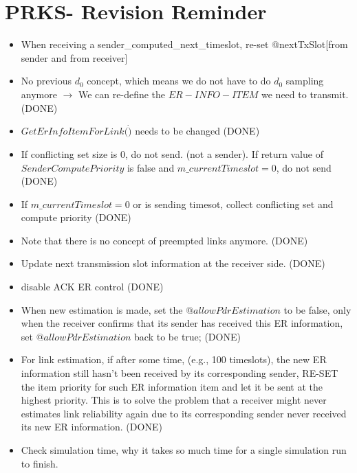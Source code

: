 \section {PRKS- Revision Reminder}
\begin{itemize}
  \item When receiving a sender\_computed\_next\_timeslot, re-set @nextTxSlot[from sender and from receiver]

  \item No previous $d_0$ concept, which means we do not have to do $d_0$ sampling anymore $\rightarrow$ We can re-define the $ER-INFO-ITEM$ we need to transmit.(DONE)
  \item $GetErInfoItemForLink (\dot)$ needs to be changed (DONE)
  \item If conflicting set size is 0, do not send. (not a sender). If return value of $SenderComputePriority$ is false and $m\_currentTimeslot = 0$, do not send (DONE)
  \item If $m\_currentTimeslot = 0$ or is sending timesot, collect conflicting set and compute priority (DONE)
  \item Note that there is no concept of preempted links anymore. (DONE)
  \item Update next transmission slot information at the receiver side. (DONE)
  \item disable ACK ER control (DONE)
  \item When new estimation is made, set the $@allowPdrEstimation$ to be false, only when the receiver confirms that its sender has received this ER information, set $@allowPdrEstimation$ back to be true; (DONE)
  \item For link estimation, if after some time, (e.g., 100 timeslots), the new ER information still hasn't been received by its corresponding sender, RE-SET the item priority for such ER information item and let it be sent at the highest priority. This is to solve the problem that a receiver might never estimates link reliability again due to its corresponding sender never received its new ER information. (DONE)
  \item Check simulation time, why it takes so much time for a single simulation run to finish.
\end{itemize}
